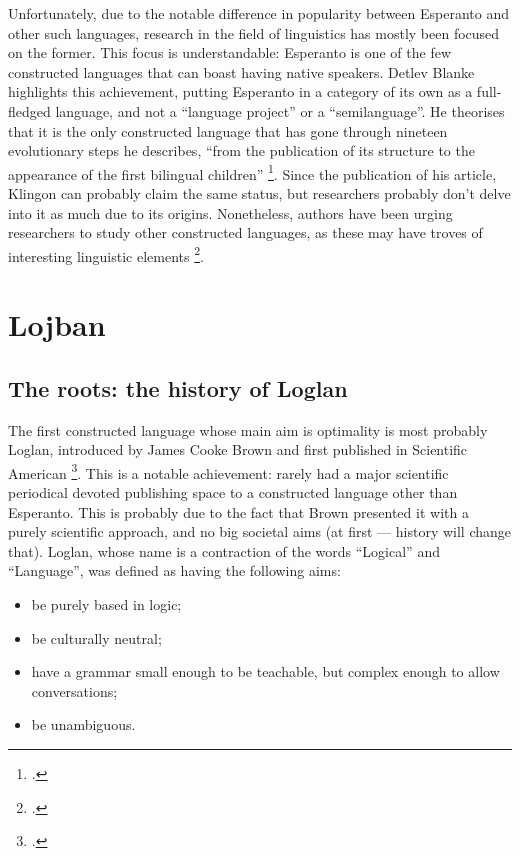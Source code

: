 \vspace{-0.05cm}
Unfortunately, due to the notable difference in popularity between Esperanto and other such languages, research in the field of linguistics has mostly been focused on the former.
This focus is understandable: Esperanto is one of the few constructed languages that can boast having native speakers. Detlev Blanke highlights this achievement, putting Esperanto
in a category of its own as a full-fledged language, and not a ``language project'' or a ``semilanguage''. He theorises that it is the only constructed language that has gone through nineteen
evolutionary steps he describes, ``from the publication of its structure to the appearance of the first bilingual children'' \footcite{blanke1989planned}.
Since the publication of his article, Klingon can probably claim the same status, but researchers probably don't delve into it as much due to its origins.
Nonetheless, authors have been urging researchers to study other constructed languages, as these may have troves of interesting linguistic elements \footcite{oostendorp2001constructed}.

\section{Lojban}

\subsection{The roots: the history of Loglan}

The first constructed language whose main aim is optimality is most probably Loglan, introduced by James Cooke Brown and first published
in Scientific American \footcite{brown1960loglan}. This is a notable achievement: rarely had a major scientific periodical devoted publishing
space to a constructed language other than Esperanto. This is probably due to the fact that Brown presented it with a purely scientific approach, and no big societal aims
(at first --- history will change that). Loglan, whose name is a contraction of the words ``Logical'' and ``Language'', was defined as having the following aims:

\begin{itemize}
    \setlength\itemsep{-0.5em}
    \item be purely based in logic;
    \item be culturally neutral;
    \item have a grammar small enough to be teachable, but complex enough to allow conversations;
    \item be unambiguous.
 \end{itemize}

